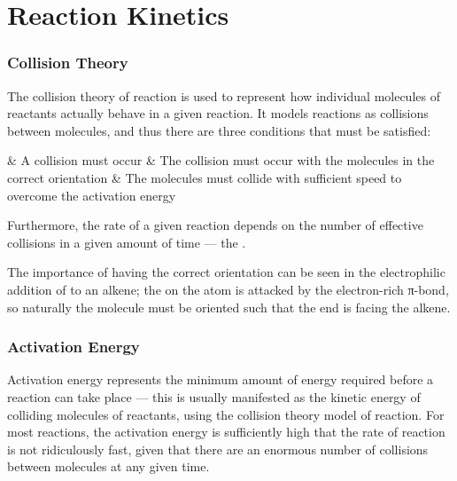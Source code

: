 
\pagebreak
\part{Reaction Kinetics}


	\section{Collision Theory}
		The collision theory of reaction is used to represent how individual molecules of reactants actually behave in a given reaction.
		It models reactions as collisions between molecules, and thus there are three conditions that must be satisfied:

		\begin{bulletlist}
			& A collision must occur
			& The collision must occur with the molecules in the correct orientation
			& The molecules must collide with sufficient speed to overcome the activation energy
		\end{bulletlist}

		Furthermore, the rate of a given reaction depends on the number of effective collisions in a given amount of time --- the
		.

		The importance of having the correct orientation can be seen in the electrophilic addition of  to an alkene; the \deltap
		on the  atom is attacked by the electron-rich π-bond, so naturally the  molecule must be oriented such that the 
		end is facing the alkene.




	\section{Activation Energy}

		Activation energy represents the minimum amount of energy required before a reaction can take place --- this is usually manifested as
		the kinetic energy of colliding molecules of reactants, using the collision theory model of reaction. For most reactions, the activation
		energy is sufficiently high that the rate of reaction is not ridiculously fast, given that there are an enormous number of collisions
		between molecules at any given time.


